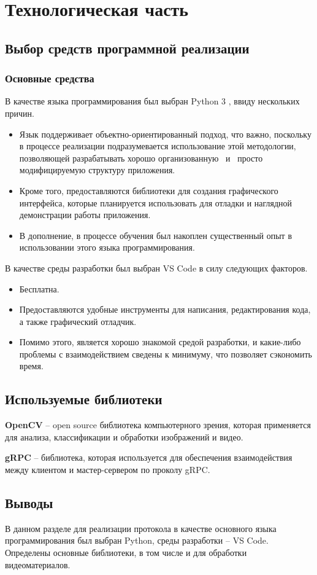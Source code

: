 \section{Технологическая часть}
\subsection{Выбор средств программной реализации}
\subsubsection{Основные средства}
В качестве языка программирования был выбран Python 3 \cite{python}, ввиду нескольких причин.
\begin{itemize}
	\item Язык поддерживает объектно-ориентированный подход, что важно, поскольку в процессе реализации подразумевается использование этой методологии, позволяющей разрабатывать хорошо организованную \, и \, просто модифицируемую структуру приложения.
	\item Кроме того, предоставляются библиотеки для создания графического интерфейса, которые планируется использовать для отладки и наглядной демонстрации работы приложения.
	\item В дополнение, в процессе обучения был накоплен существенный опыт в использовании этого языка программирования. \newline
\end{itemize}
%
В качестве среды разработки был выбран VS Code \cite{vscode} в силу следующих факторов.
\begin{itemize}
	\item Бесплатна.
	\item Предоставляются удобные инструменты для написания, редактирования кода, а также графический отладчик.
	\item Помимо этого, является хорошо знакомой средой разработки, и какие-либо проблемы с взаимодействием сведены к минимуму, что позволяет сэкономить время. \\
\end{itemize}

\subsection{Используемые библиотеки}
\textbf{OpenCV} -- open source библиотека компьютерного зрения, которая применяется для анализа, классификации и обработки изображений и видео. \cite{cv2}

\textbf{gRPC} -- библиотека, которая используется для обеспечения взаимодействия между клиентом и мастер-сервером по проколу gRPC. \cite{grpc} \\

\subsection*{Выводы}
В данном разделе для реализации протокола в качестве основного языка программирования был выбран Python, среды разработки -- VS Code. Определены основные библиотеки, в том числе и для обработки видеоматериалов. 

\pagebreak